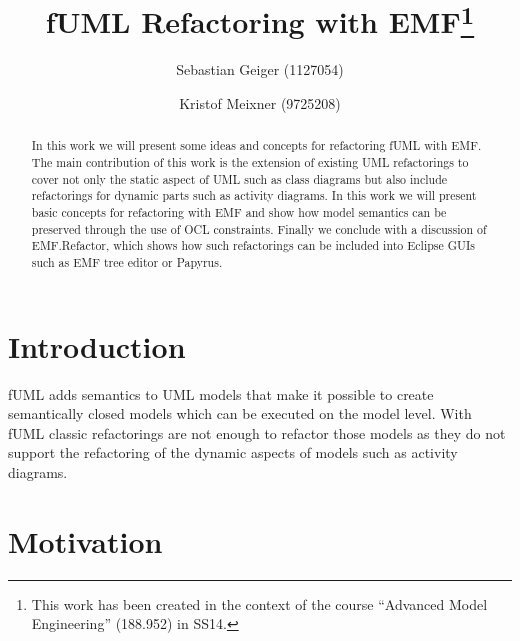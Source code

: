 \documentclass{llncs}
\begin{document}
\pagestyle{plain}

\title{fUML Refactoring with EMF\footnote{This work has been created in the context of the course ``Advanced Model Engineering'' (188.952) in SS14.}}

\author{Sebastian Geiger (1127054) \and Kristof Meixner (9725208)}

\maketitle

\begin{abstract}
In this work we will present some ideas and concepts for refactoring fUML with EMF. The main contribution of this work is the extension of
existing UML refactorings to cover not only the static aspect of UML such as class diagrams but also include refactorings for dynamic
parts such as activity diagrams. In this work we will present basic concepts for refactoring with EMF and show how model semantics can be
preserved through the use of OCL constraints. Finally we conclude with a discussion of EMF.Refactor, which shows how such refactorings
can be included into Eclipse GUIs such as EMF tree editor or Papyrus.
\end{abstract}

\tableofcontents
\newpage


\section{Introduction}
fUML adds semantics to UML models that make it possible to create semantically closed models which can be executed on the model level. With
fUML classic refactorings are not enough to refactor those models as they do not support the refactoring of the dynamic aspects of models
such as activity diagrams.

\section{Motivation}
\end{document}
